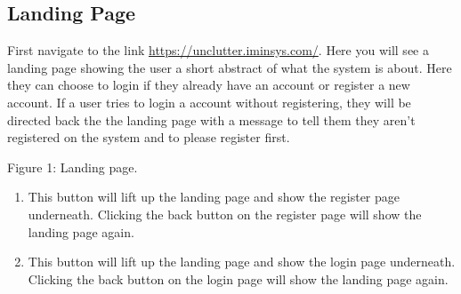 \documentclass[hidelinks,english]{article}
\begin{document}
    \subsection{Landing Page}
        First navigate to the link \url{https://unclutter.iminsys.com/}. Here you will see a landing page showing the user a short abstract of what the system is about. Here they can choose to login if they already have an account or register a new account. If a user tries to login a account without registering, they will be directed back the the landing page with a message to tell them they aren't registered on the system and to please register first.
        \begin{center}
    	  \caption{Figure 1: Landing page.}
    	  \label{Log In}
    	\end{center}
    	\begin{enumerate}
    	    \item This button will lift up the landing page and show the register page underneath. Clicking the back button on the register page will show the landing page again.
    	    \item This button will lift up the landing page and show the login page underneath. Clicking the back button on the login page will show the landing page again.
    	\end{enumerate}
    	\newpage
    	
\end{document}
